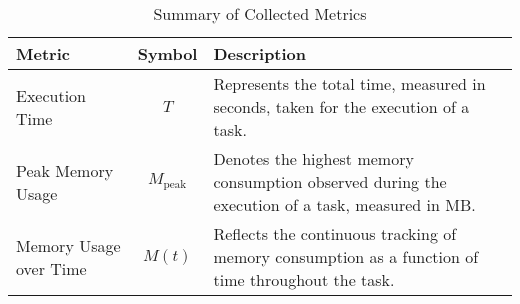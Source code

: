 
\newcommand{\T}{$T$}
\newcommand{\Mpeak}{$M_{\text{peak}}$}
\newcommand{\Mt}{$M(t)$}

\begin{table}[h]
    \centering
    \begin{tabular}{|l|c|p{5cm}|}
        \hline
        \textbf{Metric}        & \textbf{Symbol} & \textbf{Description}                                                                                 \\ \hline
        Execution Time         & \T              & Represents the total time, measured in seconds, taken for the execution of a task.                   \\ \hline
        Peak Memory Usage      & \Mpeak          & Denotes the highest memory consumption observed during the execution of a task, measured in \ac{MB}. \\ \hline
        Memory Usage over Time & \Mt             & Reflects the continuous tracking of memory consumption as a function of time throughout the task.    \\ \hline
    \end{tabular}
    \caption{Summary of Collected Metrics}
    \label{tab:summary-of-symbols}
\end{table}